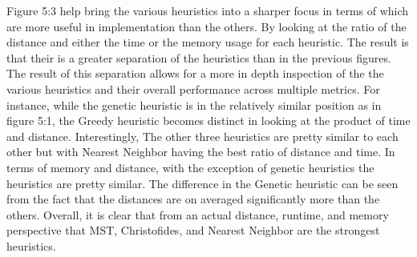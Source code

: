 \documentclass[midd]{thesis}
\newcommand{\tab}{\hspace*{2em}}
\begin{document}
\tab Figure 5:3 help bring the various heuristics into a sharper focus in terms of which are more useful in implementation than the others. By looking at the ratio of the distance and either the time or the memory usage for each heuristic. The result is that their is a greater separation of the heuristics than in the previous figures. The result of this separation allows for a more in depth inspection of the the various heuristics and their overall performance across multiple metrics. For instance, while the genetic heuristic is in the relatively similar position as in figure 5:1, the Greedy heuristic becomes distinct in looking at the product of time and distance. Interestingly, The other three heuristics are pretty similar to each other but with Nearest Neighbor having the best ratio of distance and time. In terms of memory and distance, with the exception of genetic heuristics the heuristics are pretty similar. The difference in the Genetic heuristic can be seen from the fact that the distances are on averaged significantly more than the others. Overall, it is clear that from an actual distance, runtime, and memory perspective that MST, Christofides, and Nearest Neighbor are the strongest heuristics.
\end{document}
